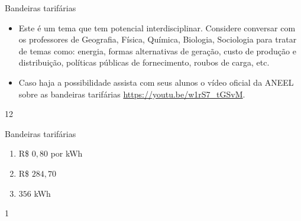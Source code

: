 \begin{sugestions}{Bandeiras tarifárias}
{
\begin{itemize}
\item Este é um tema que tem potencial interdisciplinar. Considere conversar com os professores de Geografia, Física, Química, Biologia, Sociologia para tratar de temas como: energia, formas alternativas de geração, custo de produção e distribuição, políticas públicas de fornecimento, roubos de carga, etc.

\item Caso haja a possibilidade assista com seus alunos o vídeo oficial da ANEEL sobre as bandeiras tarifárias \url{https://youtu.be/w1rS7_tGSvM}.
\end{itemize}
}{1}{2}
\end{sugestions}
\begin{answer}{Bandeiras tarifárias}
{

\begin{enumerate}
\item R\$ $0{,}80$ por kWh
\item R\$ $284{,}70$
\item $356$ kWh
\end{enumerate}
}{1}
\end{answer}



